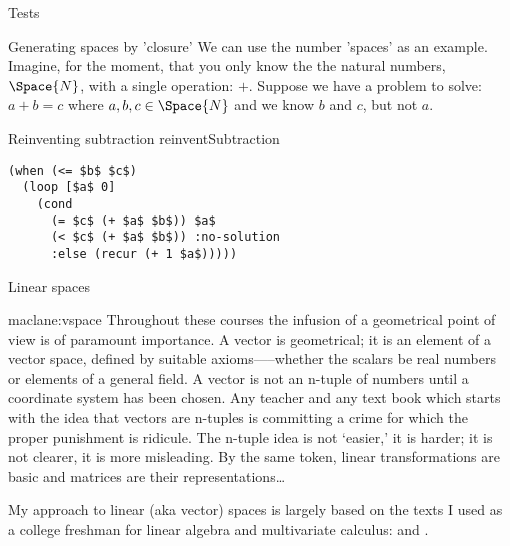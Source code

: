 \documentclass{PalisadesLakesBook}
\begin{document}
\begin{plSection}{Tests}
\begin{plSection}{Generating spaces by 'closure'}
We can use the number 'spaces' as an example.
Imagine, for the moment, that you only know the 
the natural numbers, $\Space{N}$, 
with a single operation: $+$.
Suppose we have a problem to solve:
\begin{math}
a + b = c
\end{math}
where $a,b,c\in \Space{N}$ 
and we know $b$ and $c$,
but not $a$.

\begin{plListing}
[breakable=false]
{Reinventing subtraction}
{reinventSubtraction}
\begin{lstlisting}
(when (<= $b$ $c$)
  (loop [$a$ 0]
    (cond 
      (= $c$ (+ $a$ $b$)) $a$
      (< $c$ (+ $a$ $b$)) :no-solution
      :else (recur (+ 1 $a$)))))
\end{lstlisting}
\end{plListing}

\end{plSection}%
\begin{plSection}{Linear spaces}
\label{sec:Linear-spaces}

\begin{plQuote}
{}
{maclane:vspace}
{Throughout these courses the infusion of a geometrical
point of view is of paramount importance. A vector
is geometrical; it is an element of a vector space, defined
by suitable axioms—--whether the scalars be real numbers or
elements of a general field. A vector is not an n-tuple of
numbers until a coordinate system has been chosen. Any
teacher and any text book which starts with the idea that vectors
are n-tuples is committing a crime for which the proper
punishment is ridicule. The n-tuple idea is not ‘easier,’ it is
harder; it is not clearer, it is more misleading. By the same
token, linear transformations are basic and matrices are their
representations\ldots}
\end{plQuote}

My approach to linear (aka vector) spaces is largely based on
the texts I used as a college freshman for linear algebra and
multivariate calculus: 
and .


\end{plSection}
\end{plSection}
\end{document}
